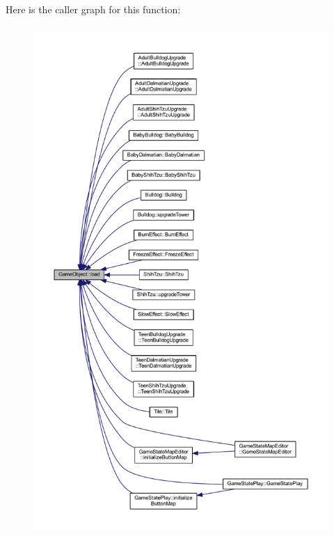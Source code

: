 Here is the caller graph for this function\+:\nopagebreak
\begin{figure}[H]
\begin{center}
\leavevmode
\includegraphics[height=550pt]{class_game_object_acc593e5b75a58c4a59ad59da654ce807_icgraph}
\end{center}
\end{figure}



